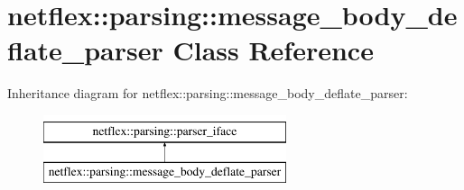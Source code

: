 \hypertarget{classnetflex_1_1parsing_1_1message__body__deflate__parser}{}\section{netflex\+:\+:parsing\+:\+:message\+\_\+body\+\_\+deflate\+\_\+parser Class Reference}
\label{classnetflex_1_1parsing_1_1message__body__deflate__parser}
Inheritance diagram for netflex\+:\+:parsing\+:\+:message\+\_\+body\+\_\+deflate\+\_\+parser\+:\begin{figure}[H]
\begin{center}
\leavevmode
\includegraphics[height=2.000000cm]{classnetflex_1_1parsing_1_1message__body__deflate__parser}
\end{center}
\end{figure}
